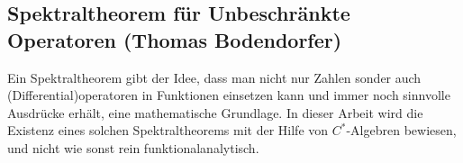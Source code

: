 \subsection{Spektraltheorem f\"ur Unbeschr\"ankte Operatoren
(Thomas Bodendorfer)}

Ein Spektraltheorem gibt der Idee, dass man nicht nur Zahlen sonder auch
(Differential)operatoren in Funktionen einsetzen kann und immer noch sinnvolle
Ausdrücke erhält, eine mathematische Grundlage. In dieser Arbeit wird die
Existenz eines solchen Spektraltheorems mit der Hilfe von $C^*$-Algebren
bewiesen, und nicht wie sonst rein funktionalanalytisch.
